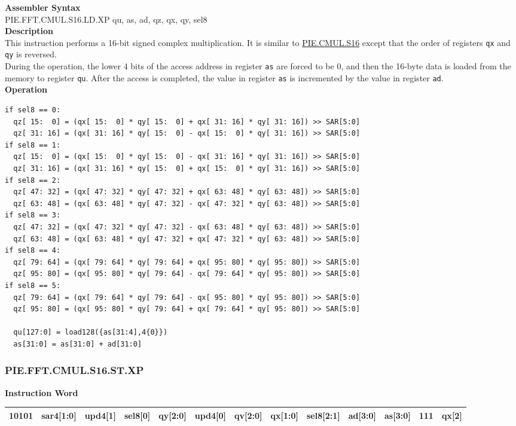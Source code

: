 \textbf{Assembler Syntax} \\
PIE.FFT.CMUL.S16.LD.XP qu, as, ad, qz, qx, qy, sel8 \\
\textbf{Description} \\
This instruction performs a 16-bit signed complex multiplication. It is similar to \hyperref[instruction:PIECMULS16]{PIE.CMUL.S16} except that the order of registers \lstinline{qx} and \lstinline{qy} is reversed.\\
During the operation, the lower 4 bits of the access address in register \lstinline{as} are forced to be 0, and then the 16-byte data is loaded from the memory to register \lstinline{qu}. After the access is completed, the value in register \lstinline{as} is incremented by the value in register \lstinline{ad}.\\
\textbf{Operation}
\begin{lstlisting}
if sel8 == 0:
  qz[ 15:  0] = (qx[ 15:  0] * qy[ 15:  0] + qx[ 31: 16] * qy[ 31: 16]) >> SAR[5:0]
  qz[ 31: 16] = (qx[ 31: 16] * qy[ 15:  0] - qx[ 15:  0] * qy[ 31: 16]) >> SAR[5:0]
if sel8 == 1:
  qz[ 15:  0] = (qx[ 15:  0] * qy[ 15:  0] - qx[ 31: 16] * qy[ 31: 16]) >> SAR[5:0]
  qz[ 31: 16] = (qx[ 31: 16] * qy[ 15:  0] + qx[ 15:  0] * qy[ 31: 16]) >> SAR[5:0]
if sel8 == 2:
  qz[ 47: 32] = (qx[ 47: 32] * qy[ 47: 32] + qx[ 63: 48] * qy[ 63: 48]) >> SAR[5:0]
  qz[ 63: 48] = (qx[ 63: 48] * qy[ 47: 32] - qx[ 47: 32] * qy[ 63: 48]) >> SAR[5:0]
if sel8 == 3:
  qz[ 47: 32] = (qx[ 47: 32] * qy[ 47: 32] - qx[ 63: 48] * qy[ 63: 48]) >> SAR[5:0]
  qz[ 63: 48] = (qx[ 63: 48] * qy[ 47: 32] + qx[ 47: 32] * qy[ 63: 48]) >> SAR[5:0]
if sel8 == 4:
  qz[ 79: 64] = (qx[ 79: 64] * qy[ 79: 64] + qx[ 95: 80] * qy[ 95: 80]) >> SAR[5:0]
  qz[ 95: 80] = (qx[ 95: 80] * qy[ 79: 64] - qx[ 79: 64] * qy[ 95: 80]) >> SAR[5:0]
if sel8 == 5:
  qz[ 79: 64] = (qx[ 79: 64] * qy[ 79: 64] - qx[ 95: 80] * qy[ 95: 80]) >> SAR[5:0]
  qz[ 95: 80] = (qx[ 95: 80] * qy[ 79: 64] + qx[ 79: 64] * qy[ 95: 80]) >> SAR[5:0]

  qu[127:0] = load128({as[31:4],4{0}})
  as[31:0] = as[31:0] + ad[31:0]
\end{lstlisting}

\newpage
\subsubsection{PIE.FFT.CMUL.S16.ST.XP}\label{instruction:PIEFFTCMULS16STXP}
\setlength\tabcolsep{5pt}
\textbf{Instruction Word} \\
\begin{tabular}{|c|c|c|c|c|c|c|c|c|c|c|c|c|}
	\hline
	10101 & sar4[1:0] & upd4[1] & sel8[0] & qy[2:0] & upd4[0] & qv[2:0] & qx[1:0] & sel8[2:1] & ad[3:0] & as[3:0] & 111 & qx[2] \\
	\hline
\end{tabular}

